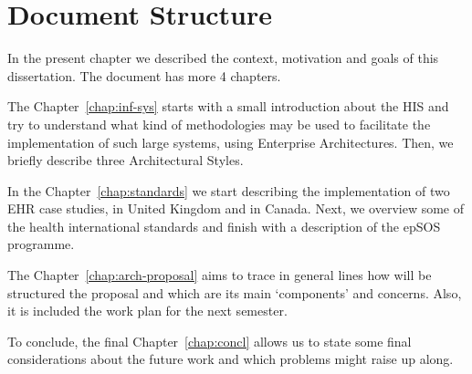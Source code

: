 
\section{Document Structure} \label{sec:struct}

In the present chapter we described the context, motivation and goals of this dissertation. The document has more 4 chapters.

The Chapter~\ref{chap:inf-sys} starts with a small introduction about the HIS and try to understand what kind of methodologies may be used to facilitate the implementation of such large systems, using Enterprise Architectures. Then, we briefly describe three Architectural Styles.

In the Chapter~\ref{chap:standards} we start describing the implementation of two EHR case studies, in United Kingdom and in Canada. Next, we overview some of the health international standards and finish with a description of the epSOS programme.

The Chapter~\ref{chap:arch-proposal} aims to trace in general lines how will be structured the proposal and which are its main `components' and concerns. Also, it is included the work plan for the next semester.

To conclude, the final Chapter~\ref{chap:concl} allows us to state some final considerations about the future work and which problems might raise up along.

